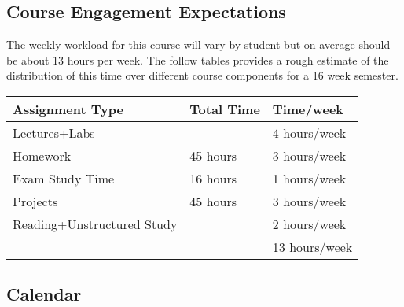 \documentclass[10pt]{article}
\begin{document}
\subsection{Course Engagement Expectations}

The weekly workload for this course will vary by student but on average should be about 13 hours per week.  The follow tables provides a rough estimate of the distribution of this time over different course components for a 16 week semester.
\begin{center}
\begin{tabular}{lll}
Assignment Type & Total Time & Time/week \\ \toprule
Lectures+Labs &      & 4 hours/week \\
Homework & 45 hours        & 3 hours/week \\
Exam Study Time & 16 hours  & 1 hours/week \\
Projects & 45 hours        & 3 hours/week \\
Reading+Unstructured Study & & 2 hours/week \\
\bottomrule
& & 13 hours/week
\end{tabular}
\end{center}


\subsection{Calendar}
\end{document}
